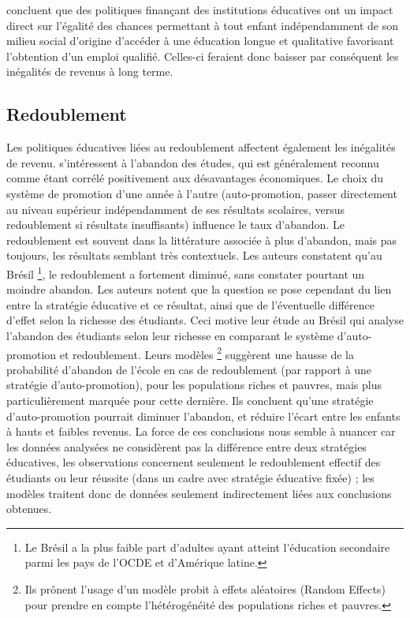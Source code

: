 \documentclass[pagesize, twoside=off, bibliography=totoc, DIV=calc, fontsize=12pt, a4paper, french]{scrartcl}
\begin{document}
 concluent que des politiques finançant des institutions éducatives ont un impact direct sur l’égalité des chances permettant à tout enfant indépendamment de son milieu social d’origine d’accéder à une éducation longue et qualitative favorisant l’obtention d’un emploi qualifié. Celles-ci feraient donc baisser par conséquent les inégalités de revenus à long terme. 

\subsection{Redoublement}

Les politiques éducatives liées au redoublement affectent également les inégalités de revenu.  s’intéressent à l’abandon des études, qui est généralement reconnu comme étant corrélé positivement aux désavantages économiques. Le choix du système de promotion d’une année à l’autre (auto-promotion, passer directement au niveau supérieur indépendamment de ses résultats scolaires, versus redoublement si résultats insuffisants) influence le taux d’abandon. Le redoublement est souvent dans la littérature associée à plus d’abandon, mais pas toujours, les résultats semblant très contextuels. Les auteurs constatent qu’au Brésil \footnote{Le Brésil a la plus faible part d’adultes ayant atteint l’éducation secondaire parmi les pays de l’OCDE et d’Amérique latine.}, le redoublement a fortement diminué, sans constater pourtant un moindre abandon. Les auteurs notent que la question se pose cependant du lien entre la stratégie éducative et ce résultat, ainsi que de l’éventuelle différence d’effet selon la richesse des étudiants. Ceci motive leur étude au Brésil qui analyse l’abandon des étudiants selon leur richesse en comparant le système d’auto-promotion et redoublement. Leurs modèles \footnote{Ils prônent l’usage d’un modèle probit à effets aléatoires (Random Effects) pour prendre en compte l’hétérogénéité des populations riches et pauvres.} suggèrent une hausse de la probabilité d’abandon de l’école en cas de redoublement (par rapport à une stratégie d’auto-promotion), pour les populations riches et pauvres, mais plus particulièrement marquée pour cette dernière. Ils concluent qu’une stratégie d’auto-promotion pourrait diminuer l’abandon, et réduire l’écart entre les enfants à hauts et faibles revenus. La force de ces conclusions nous semble à nuancer car les données analysées ne considèrent pas la différence entre deux stratégies éducatives, les observations concernent seulement le redoublement effectif des étudiants ou leur réussite (dans un cadre avec stratégie éducative fixée) ; les modèles traitent donc de données seulement indirectement liées aux conclusions obtenues.
\end{document}
